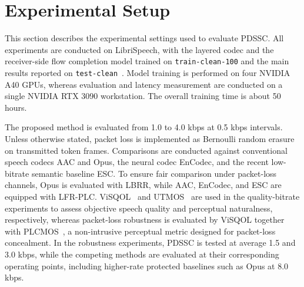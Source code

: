 \documentclass[conference]{IEEEtran}
\begin{document}
\section{Experimental Setup}
This section describes the experimental settings used to evaluate PDSSC. All experiments are conducted on LibriSpeech, with the layered codec and the receiver-side flow completion model trained on \texttt{train-clean-100} and the main results reported on \texttt{test-clean}~\cite{panayotov2015librispeech}. Model training is performed on four NVIDIA A40 GPUs, whereas evaluation and latency measurement are conducted on a single NVIDIA RTX 3090 workstation. The overall training time is about 50 hours.

The proposed method is evaluated from 1.0 to 4.0 kbps at 0.5 kbps intervals. Unless otherwise stated, packet loss is implemented as Bernoulli random erasure on transmitted token frames. Comparisons are conducted against conventional speech codecs AAC and Opus, the neural codec EnCodec, and the recent low-bitrate semantic baseline ESC. To ensure fair comparison under packet-loss channels, Opus is evaluated with LBRR, while AAC, EnCodec, and ESC are equipped with LFR-PLC. ViSQOL~\cite{hines2015visqol} and UTMOS~\cite{saeki2022utmos} are used in the quality-bitrate experiments to assess objective speech quality and perceptual naturalness, respectively, whereas packet-loss robustness is evaluated by ViSQOL together with PLCMOS~\cite{diener2023plcmos}, a non-intrusive perceptual metric designed for packet-loss concealment. In the robustness experiments, PDSSC is tested at average 1.5 and 3.0 kbps, while the competing methods are evaluated at their corresponding operating points, including higher-rate protected baselines such as Opus at 8.0 kbps.
\end{document}
